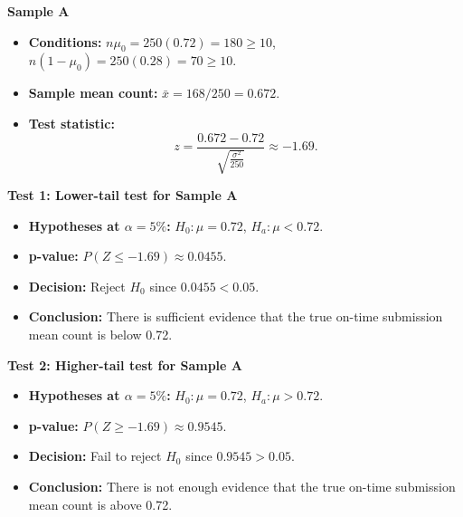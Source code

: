 \textbf{Sample A}

\begin{itemize}
	\item \textbf{Conditions:} \(n\mu_0=250(0.72)=180\ge10\), \(n(1-\mu_0)=250(0.28)=70\ge10\).
	\item \textbf{Sample mean count:} \(\bar x=168/250=0.672\).
	\item \textbf{Test statistic:}
	\[
	z=\frac{0.672-0.72}{\sqrt{\frac{\sigma^2}{250}}}\approx -1.69.
	\]
\end{itemize}

\textbf{Test 1: Lower-tail test for Sample A}

\begin{itemize}
	\item \textbf{Hypotheses at \(\alpha=5\%\):} \(H_0\colon \mu=0.72\), \(H_a\colon \mu<0.72\).
	\item \textbf{p-value:} \(P(Z\le -1.69)\approx 0.0455\).
	\item \textbf{Decision:} Reject \(H_0\) since \(0.0455<0.05\).
	\item \textbf{Conclusion:} There is sufficient evidence that the true on-time submission mean count is below 0.72.
\end{itemize}

\begin{center}
\end{center}


\textbf{Test 2: Higher-tail test for Sample A}

\begin{itemize}
	\item \textbf{Hypotheses at \(\alpha=5\%\):} \(H_0\colon \mu=0.72\), \(H_a\colon \mu>0.72\).
	\item \textbf{p-value:} \(P(Z\ge -1.69)\approx 0.9545\).
	\item \textbf{Decision:} Fail to reject \(H_0\) since \(0.9545>0.05\).
	\item \textbf{Conclusion:} There is not enough evidence that the true on-time submission mean count is above 0.72.
\end{itemize}

\begin{center}
\end{center}

